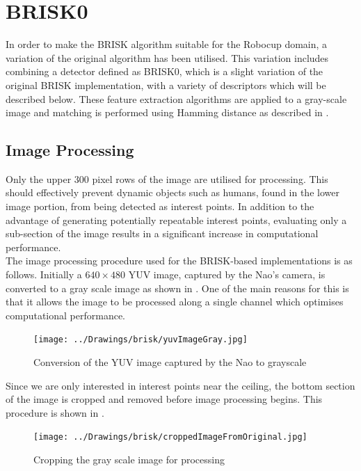 \section{BRISK0}
\label{sec:brisk0}
In order to make the BRISK algorithm suitable for the Robocup domain, a variation of the original algorithm has been utilised. This variation includes combining a detector defined as BRISK0, which is a slight variation of the original BRISK implementation, with a variety of descriptors which will be described below. These feature extraction algorithms are applied to a gray-scale image and matching is performed using Hamming distance as described in .\\

\subsection{Image Processing}
\label{sec:imageProcessingBrisk}
Only the upper $300$ pixel rows of the image are utilised for processing.  This should effectively prevent dynamic objects such as humans, found in the lower image portion, from being detected as interest points. In addition to the advantage of generating potentially repeatable interest points, evaluating only a sub-section of the image results in a significant increase in computational performance. \\ 

The image processing procedure used for the BRISK-based implementations is as follows. Initially a $640 \times 480$ YUV image, captured by the Nao's camera, is converted to a gray scale image as shown in . One of the main reasons for this is that it allows the image to be processed along a single channel which optimises computational performance. \\

\begin{figure}[h!] 
  \centering
    \texttt{[image: ../Drawings/brisk/yuvImageGray.jpg]}
    \caption{Conversion of the YUV image captured by the Nao to grayscale}
    \label{fig:colourGrayscale}
\end{figure}

Since we are only interested in interest points near the ceiling, the bottom section of the image is cropped and removed before image processing begins. This procedure is shown in .\\

\begin{figure}[h!] 
  \centering
    \texttt{[image: ../Drawings/brisk/croppedImageFromOriginal.jpg]}
    \caption{Cropping the gray scale image for processing}
    \label{fig:cropImage}
\end{figure}

